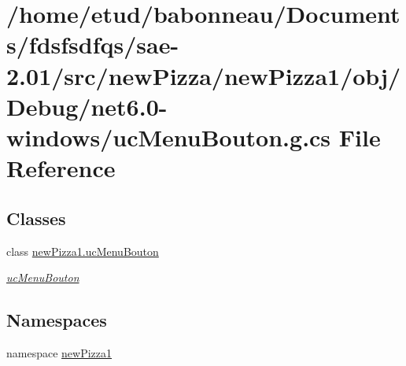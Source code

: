 \hypertarget{Debug_2net6_80-windows_2ucMenuBouton_8g_8cs}{}\section{/home/etud/babonneau/\+Documents/fdsfsdfqs/sae-\/2.01/src/new\+Pizza/new\+Pizza1/obj/\+Debug/net6.0-\/windows/uc\+Menu\+Bouton.g.\+cs File Reference}
\label{Debug_2net6_80-windows_2ucMenuBouton_8g_8cs}
\subsection*{Classes}
\begin{DoxyCompactItemize}
\item 
class \hyperlink{classnewPizza1_1_1ucMenuBouton}{new\+Pizza1.\+uc\+Menu\+Bouton}
\begin{DoxyCompactList}\small\item\em \hyperlink{classnewPizza1_1_1ucMenuBouton}{uc\+Menu\+Bouton} \end{DoxyCompactList}\end{DoxyCompactItemize}
\subsection*{Namespaces}
\begin{DoxyCompactItemize}
\item 
namespace \hyperlink{namespacenewPizza1}{new\+Pizza1}
\end{DoxyCompactItemize}
